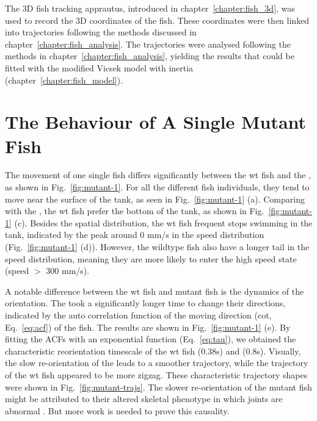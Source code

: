 \documentclass[11pt,twoside]{report}
\begin{document}
The 3D fish tracking apprautus, introduced in chapter~\ref{chapter:fish_3d}, was used to record the 3D coordinates of the fish.
These coordinates were then linked into trajectories following the methods discussed in chapter~\ref{chapter:fish_analysis}. The trajectories were analysed following the methods in chapter~\ref{chapter:fish_analysis}, yielding the results that could be fitted with the modified Vicsek model with inertia (chapter~\ref{chapter:fish_model}).


\section{The Behaviour of A Single Mutant Fish}
\label{section:mutant-1-fish}


The movement of one single fish differs significantly between the wt fish and the {\mf}, as shown in Fig.~\ref{fig:mutant-1}.
For all the different fish individuals, they tend to move near the surface of the tank, as seen in Fig.~\ref{fig:mutant-1} (a).
Comparing with the {\mf}, the wt fish prefer the bottom of the tank, as shown in Fig.~\ref{fig:mutant-1} (c).
Besides the spatial distribution, the wt fish frequent stops swimming in the tank, indicated by the peak around 0 mm/s in the speed distribution (Fig.~\ref{fig:mutant-1} (d)).
However, the wildtype fish also have a longer tail in the speed distribution, meaning they are more likely to enter the high speed state (speed $>$ 300 mm/s).


A notable difference between the wt fish and mutant fish is the dynamics of the orientation.
The {\mf} took a significantly longer time to change their directions, indicated by the auto correlation function of the moving direction (\gls{cot}, Eq.~\ref{eq:acf}) of the fish.
The results are shown in Fig.~\ref{fig:mutant-1} (e).
By fitting the ACFs with an exponential function (Eq.~\ref{eq:tau}), we obtained the characteristic reorientation timescale of the wt fish (0.38s) and {\mf} (0.8s). Visually, the slow re-orientation of the {\mf} leads to a smoother trajectory, while the trajectory of the wt fish appeared to be more zigzag. These characteristic trajectory shapes were shown in Fig.~\ref{fig:mutant-trajs}. 
The slower re-orientation of the mutant fish might be attributed to their altered skeletal phenotype in which joints are abnormal \cite{lawrence2018}. But more work is needed to prove this causality.
\end{document}
